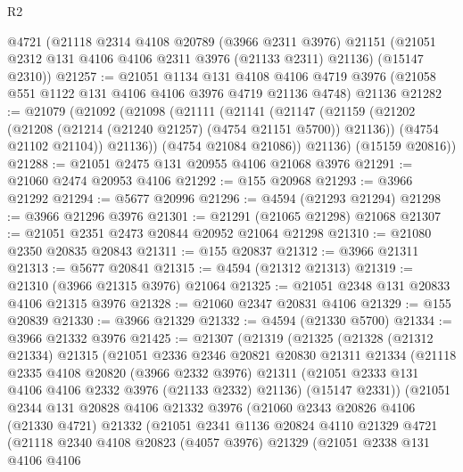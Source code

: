 \begin{lexlean}{R2}
\begin{coremodule}
    @4721
    (@21118
      @2314
      @4108
      @20789
      (@3966 @2311 @3976)
      @21151
      (@21051 @2312 @131 @4106 @4106 @2311 @3976 (@21133 @2311) @21136)
      (@15147 @2310))
@21257 := @21051
    @1134
    @131
    @4108
    @4106
    @4719
    @3976
    (@21058 @551 @1122 @131 @4106 @4106 @3976 @4719 @21136 @4748)
    @21136
@21282 := @21079
    (@21092
      (@21098
        (@21111
          (@21141
            (@21147
              (@21159
                (@21202 (@21208 (@21214 (@21240 @21257) (@4754 @21151 @5700)) @21136))
                (@4754 @21102 @21104))
              @21136))
          (@4754 @21084 @21086))
        @21136)
      (@15159 @20816))
@21288 := @21051 @2475 @131 @20955 @4106 @21068 @3976
@21291 := @21060 @2474 @20953 @4106
@21292 := @155 @20968
@21293 := @3966 @21292
@21294 := @5677 @20996
@21296 := @4594 (@21293 @21294)
@21298 := @3966 @21296 @3976
@21301 := @21291 (@21065 @21298) @21068
@21307 := @21051 @2351 @2473 @20844 @20952 @21064 @21298
@21310 := @21080 @2350 @20835 @20843
@21311 := @155 @20837
@21312 := @3966 @21311
@21313 := @5677 @20841
@21315 := @4594 (@21312 @21313)
@21319 := @21310 (@3966 @21315 @3976) @21064
@21325 := @21051 @2348 @131 @20833 @4106 @21315 @3976
@21328 := @21060 @2347 @20831 @4106
@21329 := @155 @20839
@21330 := @3966 @21329
@21332 := @4594 (@21330 @5700)
@21334 := @3966 @21332 @3976
@21425 := @21307
    (@21319
      (@21325
        (@21328
          (@21312 @21334)
          @21315
          (@21051
            @2336
            @2346
            @20821
            @20830
            @21311
            @21334
            (@21118
              @2335
              @4108
              @20820
              (@3966 @2332 @3976)
              @21311
              (@21051 @2333 @131 @4106 @4106 @2332 @3976 (@21133 @2332) @21136)
              (@15147 @2331))
            (@21051
              @2344
              @131
              @20828
              @4106
              @21332
              @3976
              (@21060
                @2343
                @20826
                @4106
                (@21330 @4721)
                @21332
                (@21051
                  @2341
                  @1136
                  @20824
                  @4110
                  @21329
                  @4721
                  (@21118
                    @2340
                    @4108
                    @20823
                    (@4057 @3976)
                    @21329
                    (@21051
                      @2338
                      @131
                      @4106
                      @4106

\end{coremodule}
\end{lexlean}
